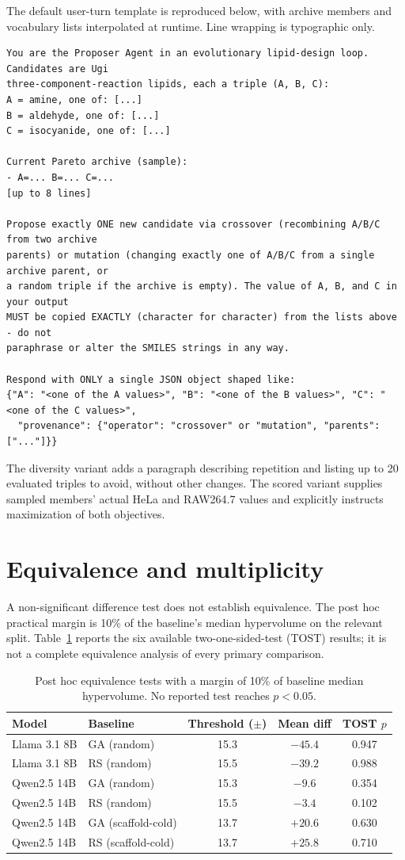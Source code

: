 The default user-turn template is reproduced below, with archive members and vocabulary lists interpolated at runtime. Line wrapping is typographic only.
\begin{Verbatim}[fontsize=\small,breaklines,breakanywhere]
You are the Proposer Agent in an evolutionary lipid-design loop. Candidates are Ugi
three-component-reaction lipids, each a triple (A, B, C):
A = amine, one of: [...]
B = aldehyde, one of: [...]
C = isocyanide, one of: [...]

Current Pareto archive (sample):
- A=... B=... C=...
[up to 8 lines]

Propose exactly ONE new candidate via crossover (recombining A/B/C from two archive
parents) or mutation (changing exactly one of A/B/C from a single archive parent, or
a random triple if the archive is empty). The value of A, B, and C in your output
MUST be copied EXACTLY (character for character) from the lists above - do not
paraphrase or alter the SMILES strings in any way.

Respond with ONLY a single JSON object shaped like:
{"A": "<one of the A values>", "B": "<one of the B values>", "C": "<one of the C values>",
  "provenance": {"operator": "crossover" or "mutation", "parents": ["..."]}}
\end{Verbatim}
The diversity variant adds a paragraph describing repetition and listing up to 20 evaluated triples to avoid, without other changes. The scored variant supplies sampled members' actual HeLa and RAW264.7 values and explicitly instructs maximization of both objectives.

\section{Equivalence and multiplicity}
\label{app:equivalence}
A non-significant difference test does not establish equivalence. The post hoc practical margin is 10\% of the baseline's median hypervolume on the relevant split. Table~\ref{tab:tost} reports the six available two-one-sided-test (TOST) results; it is not a complete equivalence analysis of every primary comparison.

\begin{table}[htbp]
\caption{Post hoc equivalence tests with a margin of 10\% of baseline median hypervolume. No reported test reaches $p<0.05$.}
\label{tab:tost}
\centering
\begin{tabular}{@{}llccc@{}}
\toprule
Model & Baseline & Threshold ($\pm$) & Mean diff & TOST $p$ \\
\midrule
Llama 3.1 8B & GA (random) & 15.3 & $-45.4$ & 0.947 \\
Llama 3.1 8B & RS (random) & 15.5 & $-39.2$ & 0.988 \\
Qwen2.5 14B & GA (random) & 15.3 & $-9.6$ & 0.354 \\
Qwen2.5 14B & RS (random) & 15.5 & $-3.4$ & 0.102 \\
Qwen2.5 14B & GA (scaffold-cold) & 13.7 & $+20.6$ & 0.630 \\
Qwen2.5 14B & RS (scaffold-cold) & 13.7 & $+25.8$ & 0.710 \\
\bottomrule
\end{tabular}
\end{table}

